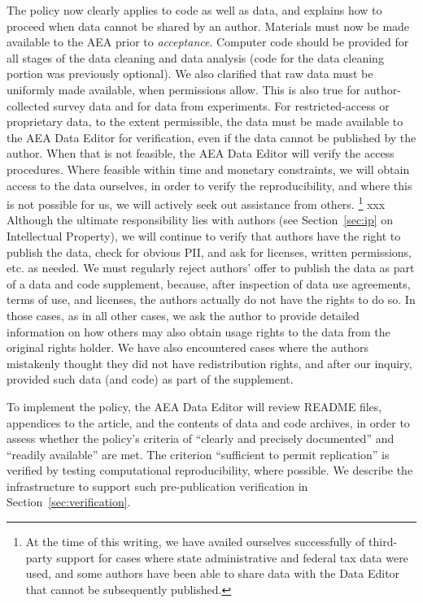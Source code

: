 \documentclass[PP]{AEA}
\begin{document}
The policy now clearly applies to code as well as data, and explains how to proceed when data cannot be shared by an author. Materials must now be made available to the AEA prior to \textit{acceptance}. Computer code should be provided for all stages of the data cleaning and data analysis (code for the data cleaning portion was previously optional). We also clarified that raw data must be uniformly made available, when permissions allow. This is also true for author-collected survey data and for data from experiments. For restricted-access or proprietary data, to the extent permissible, the data must be made available to the AEA Data Editor for verification, even if the data cannot be published by the author. When that is not feasible, the AEA Data Editor will verify the access procedures. Where feasible within time and monetary constraints, we will obtain access to the data ourselves, in order to verify the reproducibility, and where this is not possible for us, we will actively seek out  assistance from others.%
\footnote{At the time of this writing, we have availed ourselves successfully of third-party support for cases where state administrative and federal tax data were used, and some authors have been able to share data  with the Data Editor that cannot be subsequently published.} xxx
Although the ultimate responsibility lies with authors (see Section~\ref{sec:ip} on Intellectual Property), we will continue to verify that authors have the right to publish the data, check for obvious \ac{PII}, and ask for licenses, written permissions, etc. as needed. We must regularly  reject authors' offer to publish the data as part of a data and code supplement, because, after inspection of data use agreements, terms of use, and licenses, the authors actually do not have the rights to do so. In those cases, as in all other cases, we ask the author to provide detailed information on how others may also obtain usage rights to the data from the original rights holder. We have also encountered cases where the authors mistakenly thought they did not have redistribution rights, and after our inquiry, provided such data (and code) as part of the supplement.


To implement the policy, the AEA Data Editor will review  README files, appendices to the article, and the contents of data and code archives, in order to assess whether the policy's  criteria of ``clearly and precisely documented'' and ``readily available'' are met.  The criterion ``sufficient to permit replication'' is verified by testing computational reproducibility, where possible. We describe the infrastructure to support such pre-publication verification in Section~\ref{sec:verification}.
\end{document}
